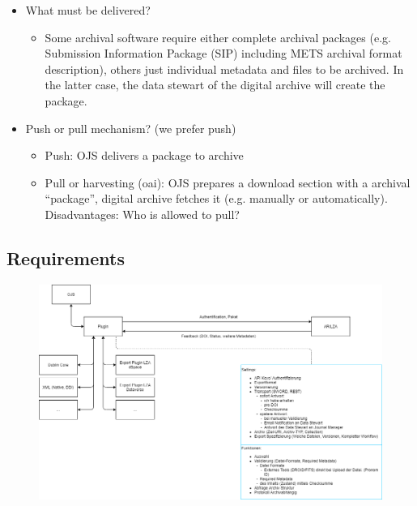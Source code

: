 \documentclass{article}
\begin{document}
\begin{itemize}
\item What must be delivered?
\begin{itemize}
\item Some archival software require either complete archival packages (e.g. Submission Information Package (SIP) including METS archival format description), others just individual metadata and files to be archived. In the latter case, the data stewart of the digital archive will create the package.
\end{itemize} 
\item Push or pull mechanism? (we prefer push)
\begin{itemize}
\item Push: OJS delivers a package to archive
\item Pull or harvesting (oai): OJS prepares a download section with a archival “package”, digital archive fetches it (e.g. manually or automatically). Disadvantages: Who is allowed to pull? 
\end{itemize} 
\end{itemize} 
\subsection[{Requirements}]{\label{w7kwrjjhkztc}Requirements}


\begin{figure}[h!]
\centering
\includegraphics[scale=0.3]{resource1.png}
\caption{}
\label{fig:universe}
\end{figure}
\end{document}
